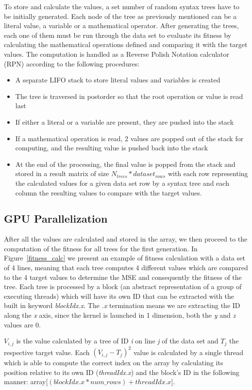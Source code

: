 \documentclass[runningheads]{llncs}
\begin{document}
To store and calculate the values, a set number of random syntax trees have to be initially generated. Each node of the tree as previously mentioned can be a literal value, a variable or a mathematical operator. After generating the trees, each one of them must be run through the data set to evaluate its fitness by calculating the mathematical operations defined and comparing it with the target values. The computation is handled as a Reverse Polish Notation calculator (RPN) according to the following procedures:
\begin{itemize}
	\item A separate LIFO stack to store literal values and variables is created
	\item The tree is traversed in postorder so that the root operation or value is read last
	\item If either a literal or a variable are present, they are pushed into the stack
	\item If a mathematical operation is read, 2 values are popped out of the stack for computing, and the resulting value is pushed back into the stack
	\item At the end of the processing, the final value is popped from the stack and stored in a result matrix of size $N_{trees}*dataset_{rows}$ with each row representing the calculated values for a given data set row by a syntax tree and each column the resulting values to compare with the target values.
\end{itemize}

\subsection{GPU Parallelization}
After all the values are calculated and stored in the array, we then proceed to the computation of the fitness for all trees for the first generation. In Figure~\ref{fitness_calc} we present an example of fitness calculation with a data set of 4 lines, meaning that each tree computes 4 different values which are compared to the 4 target values to determine the MSE and consequently the fitness of the tree. Each tree is processed by a block (an abstract representation of a group of executing threads) which will have its own ID that can be extracted with the built in keyword \textit{blockIdx.x}. The \textit{.x} termination means we are extracting the ID along the \textit{x} axis, since the kernel is launched in 1 dimension, both the \textit{y} and \textit{z} values are 0.

$V_{i,j}$ is the value calculated by a tree of ID \textit{i} on line \textit{j} of the data set and $T_{j}$ the respective target value. Each $(V_{i,j} - T_{j})^{2}$ value is calculated by a single thread which is able to compute the correct index on the array by calculating its position relative to its own ID (\textit{threadIdx.x}) and the block's ID in the following manner: array[$(blockIdx.x * num\_rows) + threadIdx.x$].
\end{document}
